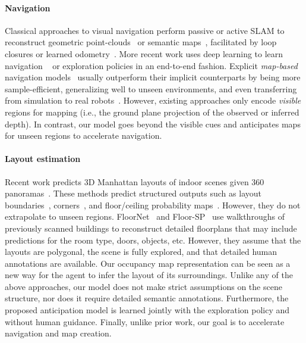 \documentclass[runningheads]{llncs}
\begin{document}
\paragraph{Navigation} Classical approaches to visual navigation perform passive or active SLAM to reconstruct geometric point-clouds~\cite{thrun2002probabilistic,hartley2003multiple} or semantic maps~\cite{bao2012semantic,salas2013slam++}, facilitated by loop closures or learned odometry~\cite{cadena2016past,martinez2009bayesian,carrillo2012comparison}.  More recent work uses deep learning to learn navigation ~\cite{zhu-iccv2017,gupta2017cognitive,savinov2018semi,mousavian2019visual,yang2018visual,amodal,sax2018mid,shen2019situational} or exploration \cite{pathak2017curiosity,burada2018curiosity,savinov2018episodic,dinesh2018ltla,ramakrishnan2019emergence} policies in an end-to-end fashion. Explicit \emph{map-based} navigation models~\cite{gupta2017unifying,parisotto2017neural,gordon2018iqa,chen2019learning} usually outperform their implicit counterparts by being more sample-efficient, generalizing well to unseen environments, and even transferring from simulation to real robots~\cite{gupta2017cognitive,chaplot2020learning}. However, existing approaches only encode \emph{visible} regions for mapping (i.e., the ground plane projection of the observed or inferred depth). In contrast, our model goes beyond the visible cues and anticipates maps for unseen regions to accelerate navigation.


\paragraph{Layout estimation} Recent work predicts 3D Manhattan layouts of indoor scenes given 360 panoramas~\cite{zou2018layoutnet,yang2019dula,Sun_2019_CVPR,wu2019residential,Dhamo_2019_ICCV}. These methods predict structured outputs such as layout boundaries~\cite{zou2018layoutnet,Sun_2019_CVPR}, corners~\cite{zou2018layoutnet}, and floor/ceiling probability maps~\cite{yang2019dula}.  However, they do not extrapolate to unseen regions. FloorNet~\cite{liu2018floornet} and Floor-SP~\cite{cjc2019floorsp} use walkthroughs of previously scanned buildings to reconstruct detailed floorplans that may include predictions for the room type, doors, objects, etc. However, they assume that the layouts are polygonal, the scene is fully explored, and that detailed human annotations are available. Our occupancy map representation can be seen as a new way for the agent to infer the layout of its surroundings. Unlike any of the above approaches, our model does not make strict assumptions on the scene structure, nor does it require detailed semantic annotations. Furthermore, the proposed anticipation model is learned jointly with the exploration policy and without human guidance. Finally, unlike prior work, our goal is to accelerate navigation and map creation.
\end{document}
